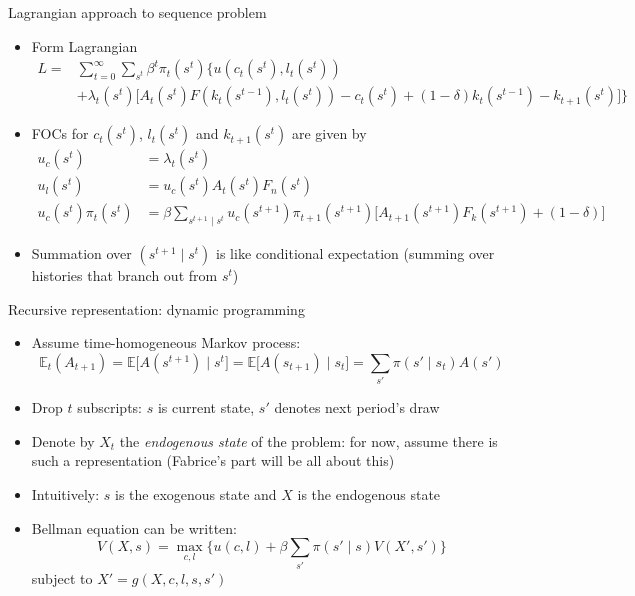 \documentclass[10pt]{beamer}
\begin{document}
\begin{frame}{Lagrangian approach to sequence problem}
\begin{itemize}
\item Form Lagrangian 
\begin{align*}
	L = &\sum_{t=0}^\infty \sum_{s^t} \beta^t \pi_t(s^t) \bigg\{ u (c_t(s^t), l_t(s^t)) \\
	&+ \lambda_t(s^t) \bigg[ A_t(s^t) F(k_t(s^{t-1}), l_t(s^t)) - c_t(s^t) + (1-\delta) k_t(s^{t-1})  - k_{t+1}(s^t) \bigg] \bigg\}
\end{align*}

\item FOCs for $c_t(s^t)$, $l_t(s^t)$ and $k_{t+1}(s^t)$ are given by
\begin{align*}
	u_c(s^t) &= \lambda_t(s^t) \\
	u_l(s^t) &= u_c(s^t) A_t(s^t) F_n(s^t) \\
	u_c(s^t) \pi_t(s^t) &= \beta \sum_{s^{t+1} \mid s^t} u_c(s^{t+1}) \pi_{t+1}(s^{t+1}) \bigg[ A_{t+1} (s^{t+1}) F_k (s^{t+1}) + (1-\delta) \bigg]
\end{align*}

\item Summation over $(s^{t+1} \mid s^t)$ is like conditional expectation (summing over histories that branch out from $s^t$)
\end{itemize}
\end{frame}



\begin{frame}{Recursive representation: dynamic programming}
\begin{itemize}
\item Assume time-homogeneous Markov process:
\begin{equation*}
	\mathbb E_t (A_{t+1}) = \mathbb E \Big[ A(s^{t+1}) \mid s^t \Big] = \mathbb E \Big[ A(s_{t+1}) \mid s_t \Big] = \sum_{s'} \pi(s' \mid s_t) A(s')
\end{equation*}

\item Drop $t$ subscripts: $s$ is current state, $s'$ denotes next period's draw

\item Denote by $X_t$ the \textit{endogenous state} of the problem: for now, assume there is such a representation (Fabrice's part will be all about this)

\item Intuitively: $s$ is the exogenous state and $X$ is the endogenous state 

\item Bellman equation can be written: 
\begin{equation*}
	V(X, s) = \max_{c, l} \bigg\{ u(c, l) + \beta \sum_{s'} \pi(s' \mid s) V(X', s') \bigg\}
\end{equation*}
subject to $X' = g(X, c, l, s, s')$
\end{itemize}
\end{frame}







\appendix
\end{document}
